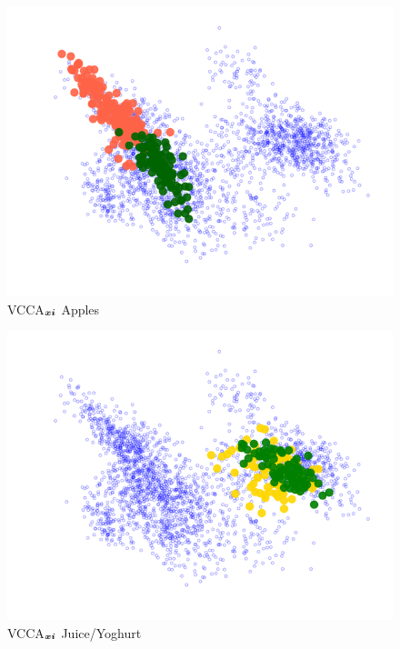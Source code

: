 \begin{subfigure}[b]{0.3\textwidth}
	\centering
	\includegraphics[width=\textwidth]{Chapter1/pics_paperB/pca_latents_apples_vcca_xi_seed2}
	\caption{VCCA$_{{\bm{x}}{\bm{i}}}$ Apples}
	\label{fig:pca_latents_vcca_xi_apples}
\end{subfigure}
\hfill
\begin{subfigure}[b]{0.3\textwidth}
	\centering
	\includegraphics[width=\textwidth]{Chapter1/pics_paperB/pca_latents_juice_yoghurt_vcca_xi_seed2}
	\caption{VCCA$_{{\bm{x}}{\bm{i}}}$ Juice/Yoghurt}
	\label{fig:pca_latents_vcca_xi_juice_yoghurt}
\end{subfigure} \\

